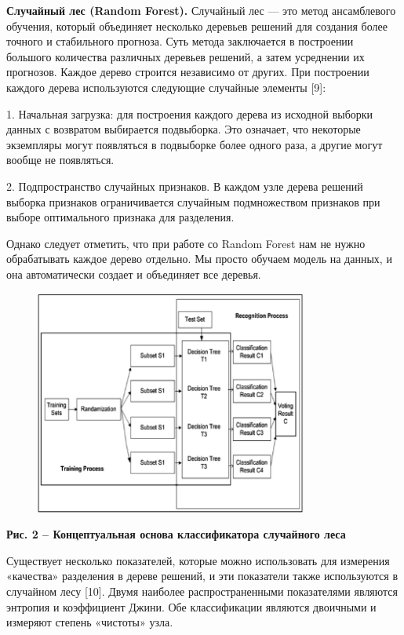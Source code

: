 {\bfseries Случайный лес (Random Forest).} Случайный лес --- это метод
ансамблевого обучения, который объединяет несколько деревьев решений для
создания более точного и стабильного прогноза. Суть метода заключается в
построении большого количества различных деревьев решений, а затем
усреднении их прогнозов. Каждое дерево строится независимо от других.
При построении каждого дерева используются следующие случайные элементы
{[}9{]}:

1. Начальная загрузка: для построения каждого дерева из исходной выборки
данных с возвратом выбирается подвыборка. Это означает, что некоторые
экземпляры могут появляться в подвыборке более одного раза, а другие
могут вообще не появляться.

2. Подпространство случайных признаков. В каждом узле дерева решений
выборка признаков ограничивается случайным подмножеством признаков при
выборе оптимального признака для разделения.

Однако следует отметить, что при работе со Random Forest нам не нужно
обрабатывать каждое дерево отдельно. Мы просто обучаем модель на данных,
и она автоматически создает и объединяет все деревья.

\begin{figure}[H]
	\centering
	\includegraphics[width=0.8\textwidth]{assets/111}
	\caption*{}
\end{figure}

{\bfseries Рис. 2 -- Концептуальная основа классификатора случайного леса}

Существует несколько показателей, которые можно использовать для
измерения «качества» разделения в дереве решений, и эти показатели также
используются в случайном лесу {[}10{]}. Двумя наиболее распространенными
показателями являются энтропия и коэффициент Джини. Обе классификации
являются двоичными и измеряют степень «чистоты» узла.


